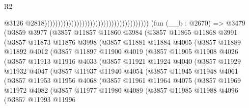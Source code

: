 \begin{lexlean}{R2}
\begin{coremodule}
                                                                                  @3126
                                                                                  @2818)))))))))))))))))))))))))))))))))))))))
    (fun (__b : @2670) =>
    @3479
      (@3859
        @3977
        (@3857
          @11857
          @11860
          @3984
          (@3857
            @11865
            @11868
            @3991
            (@3857
              @11873
              @11876
              @3998
              (@3857
                @11881
                @11884
                @4005
                (@3857
                  @11889
                  @11892
                  @4012
                  (@3857
                    @11897
                    @11900
                    @4019
                    (@3857
                      @11905
                      @11908
                      @4026
                      (@3857
                        @11913
                        @11916
                        @4033
                        (@3857
                          @11921
                          @11924
                          @4040
                          (@3857
                            @11929
                            @11932
                            @4047
                            (@3857
                              @11937
                              @11940
                              @4054
                              (@3857
                                @11945
                                @11948
                                @4061
                                (@3857
                                  @11953
                                  @11956
                                  @4068
                                  (@3857
                                    @11961
                                    @11964
                                    @4075
                                    (@3857
                                      @11969
                                      @11972
                                      @4082
                                      (@3857
                                        @11977
                                        @11980
                                        @4089
                                        (@3857
                                          @11985
                                          @11988
                                          @4096
                                          (@3857
                                            @11993
                                            @11996

\end{coremodule}
\end{lexlean}
